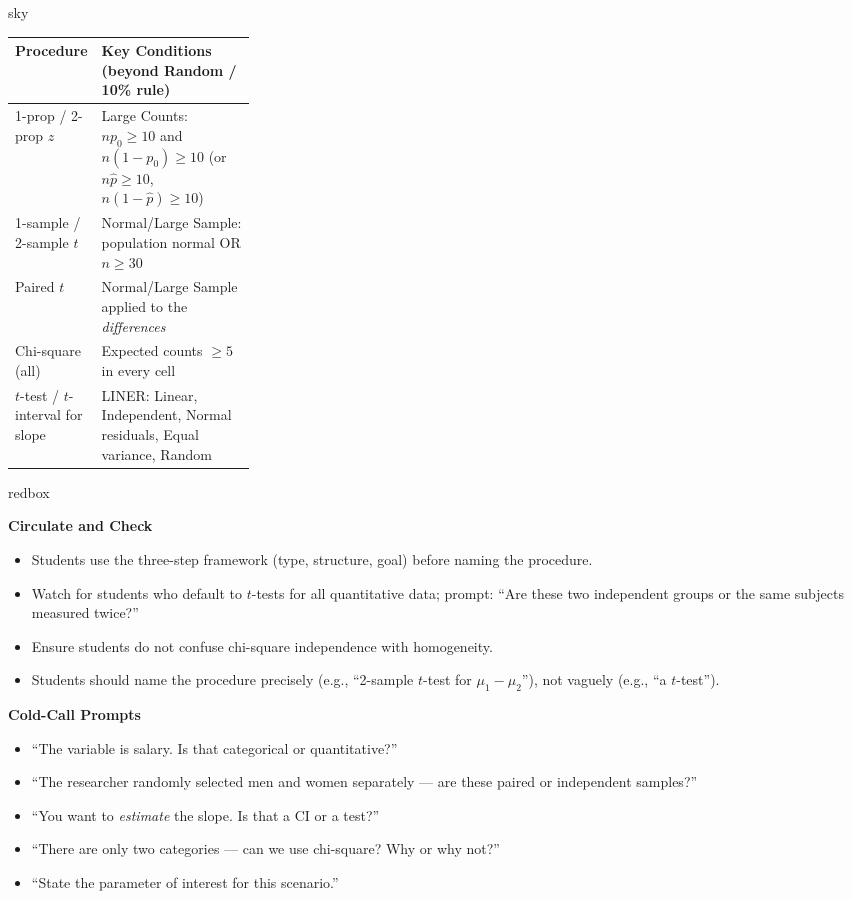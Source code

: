 \documentclass[10pt]{article}
\begin{document}
\begin{skillbox}{sky}
\renewcommand{\arraystretch}{1.9}
\begin{tabularx}{\linewidth}{@{} p{0.28\linewidth} X @{}}
  \rowcolor{sky}
  \textbf{Procedure} & \textbf{Key Conditions (beyond Random / 10\% rule)} \\
  \hline
  1-prop / 2-prop $z$ & Large Counts: $np_0 \ge 10$ and $n(1-p_0) \ge 10$ (or $n\hat p \ge 10$, $n(1-\hat p) \ge 10$) \\
  1-sample / 2-sample $t$ & Normal/Large Sample: population normal OR $n \ge 30$ \\
  Paired $t$ & Normal/Large Sample applied to the \emph{differences} \\
  Chi-square (all) & Expected counts $\ge 5$ in every cell \\
  $t$-test / $t$-interval for slope & LINER: Linear, Independent, Normal residuals, Equal variance, Random \\
\end{tabularx}
\end{skillbox}

\begin{skillbox}{redbox}
\begin{minipage}[t]{0.48\linewidth}
    \textbf{Circulate and Check}
    \begin{itemize}
        \item Students use the three-step framework (type, structure, goal) before
              naming the procedure.
        \item Watch for students who default to $t$-tests for all quantitative data;
              prompt: ``Are these two independent groups or the same subjects measured twice?''
        \item Ensure students do not confuse chi-square independence with homogeneity.
        \item Students should name the procedure precisely (e.g., ``2-sample $t$-test for
              $\mu_1 - \mu_2$''), not vaguely (e.g., ``a $t$-test'').
    \end{itemize}
\end{minipage}
\hfill
\begin{minipage}[t]{0.48\linewidth}
    \textbf{Cold-Call Prompts}
    \begin{itemize}
        \item ``The variable is salary. Is that categorical or quantitative?''
        \item ``The researcher randomly selected men and women separately --- are these
              paired or independent samples?''
        \item ``You want to \emph{estimate} the slope. Is that a CI or a test?''
        \item ``There are only two categories --- can we use chi-square? Why or why not?''
        \item ``State the parameter of interest for this scenario.''
    \end{itemize}
\end{minipage}
\end{skillbox}
\end{document}
